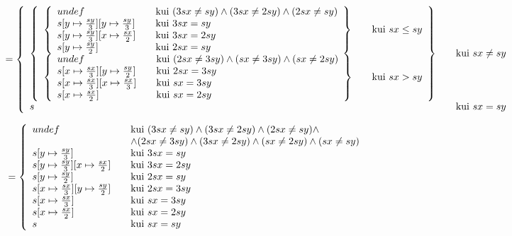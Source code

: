 \(
=
\left \{ \begin{array}{l l}
  \left \{ \begin{array}{l l}
    \left \{ \begin{array}{l l}
      undef & \quad \text{kui}\ (3sx \neq sy) \wedge (3sx \neq 2sy) \wedge (2sx \neq sy)\\
      s[y \mapsto \frac{sy}{3}][y \mapsto \frac{sy}{3} ] & \quad \text{kui}\ 3sx = sy \\
      s[y \mapsto \frac{sy}{3}][x \mapsto \frac{sx}{2} ] & \quad \text{kui}\ 3sx = 2sy \\
      s[y \mapsto \frac{sy}{2}] & \quad \text{kui}\ 2sx = sy \\
    \end{array} \right \} & \quad \text{kui}\ sx \leq sy \\
    \left \{ \begin{array}{l l}
      undef & \quad \text{kui}\ (2sx \neq 3sy) \wedge (sx \neq 3sy) \wedge (sx \neq 2sy) \\
      s[x \mapsto \frac{sx}{3}][y \mapsto \frac{sy}{2} ] & \quad \text{kui}\ 2sx = 3sy \\
      s[x \mapsto \frac{sx}{3}][x \mapsto \frac{sx}{3} ] & \quad \text{kui}\ sx = 3sy \\
      s[x \mapsto \frac{sx}{2}] & \quad \text{kui}\ sx = 2sy \\
    \end{array} \right \} & \quad \text{kui}\ sx > sy \\
  \end{array} \right \} & \quad \text{kui}\ sx \neq sy \\
  s & \quad \text{kui}\ sx = sy \\
\end{array} \right.
\)

\(
\\
\\
=
\left \{ \begin{array}{l l}
  undef & \quad \text{kui}\ (3sx \neq sy) \wedge (3sx \neq 2sy) \wedge (2sx \neq sy) \wedge \\
        & \quad \wedge (2sx \neq 3sy) \wedge (3sx \neq 2sy) \wedge (sx \neq 2sy) \wedge (sx \neq sy) \\
  s[y \mapsto \frac{sy}{3} ] & \quad \text{kui}\ 3sx = sy \\
  s[y \mapsto \frac{sy}{3}][x \mapsto \frac{sx}{2} ] & \quad \text{kui}\ 3sx = 2sy \\
  s[y \mapsto \frac{sy}{2}] & \quad \text{kui}\ 2sx = sy \\
  s[x \mapsto \frac{sx}{3}][y \mapsto \frac{sy}{2} ] & \quad \text{kui}\ 2sx = 3sy \\
  s[x \mapsto \frac{sx}{3} ] & \quad \text{kui}\ sx = 3sy \\
  s[x \mapsto \frac{sx}{2}] & \quad \text{kui}\ sx = 2sy \\
  s & \quad \text{kui}\ sx = sy \\
\end{array} \right.
\)

